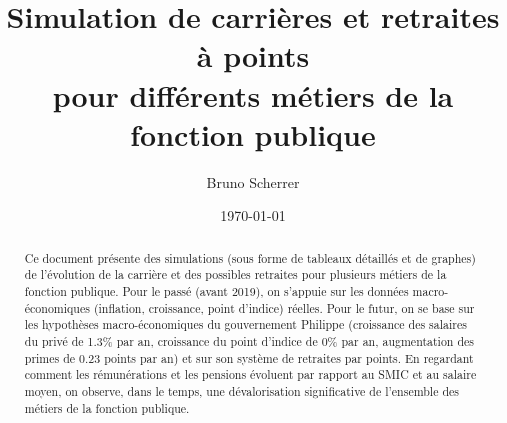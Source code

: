 \documentclass[a4paper,10pt]{report}
\title{Simulation de carrières et retraites à points\\pour différents métiers de la fonction publique}
\author{Bruno Scherrer}
\date{\today}
\begin{document}
\dominitoc

\maketitle

\doclicenseThis

\begin{abstract}
  Ce document présente des simulations (sous forme de tableaux détaillés et de graphes) de l'évolution de la carrière et des possibles retraites pour plusieurs métiers de la fonction publique. Pour le passé (avant 2019), on s'appuie sur les données macro-économiques (inflation, croissance, point d'indice) réelles. Pour le futur, on se base sur les hypothèses macro-économiques du gouvernement Philippe (croissance des salaires du privé de 1.3\% par an, croissance du point d'indice de 0\% par an, augmentation des primes de 0.23 points par an) et sur son système de retraites par points. En regardant comment les rémunérations et les pensions évoluent par rapport au SMIC et au salaire moyen, on observe, dans le temps, une dévalorisation significative de l'ensemble des métiers de la fonction publique.
\end{abstract}

\setcounter{tocdepth}{0}
\tableofcontents


\end{document}
